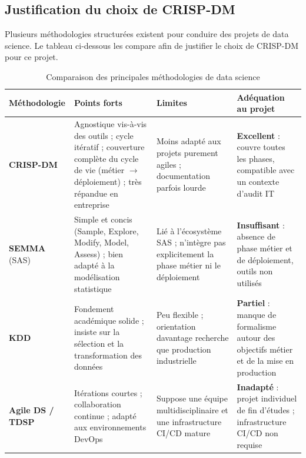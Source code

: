 \documentclass[12pt,a4paper,twoside]{report}
\begin{document}
\subsection{Justification du choix de CRISP-DM}

Plusieurs méthodologies structurées existent pour conduire des projets de data science. Le tableau ci-dessous les compare afin de justifier le choix de CRISP-DM pour ce projet.

\begin{table}[H]
\centering

\begin{tabular}{p{2.5cm}p{3.5cm}p{3.5cm}p{3.5cm}}
\toprule
\textbf{Méthodologie} & \textbf{Points forts} & \textbf{Limites} & \textbf{Adéquation au projet} \\
\midrule
\textbf{CRISP-DM} &
  Agnostique vis-à-vis des outils ; cycle itératif ; couverture complète du cycle de vie (métier $\rightarrow$ déploiement) ; très répandue en entreprise &
  Moins adapté aux projets purement agiles ; documentation parfois lourde &
  \textbf{Excellent} : couvre toutes les phases, compatible avec un contexte d'audit IT \\[0.4cm]
\textbf{SEMMA} (SAS) &
  Simple et concis (Sample, Explore, Modify, Model, Assess) ; bien adapté à la modélisation statistique &
  Lié à l'écosystème SAS ; n'intègre pas explicitement la phase métier ni le déploiement &
  \textbf{Insuffisant} : absence de phase métier et de déploiement, outils non utilisés \\[0.4cm]
\textbf{KDD} &
  Fondement académique solide ; insiste sur la sélection et la transformation des données &
  Peu flexible ; orientation davantage recherche que production industrielle &
  \textbf{Partiel} : manque de formalisme autour des objectifs métier et de la mise en production \\[0.4cm]
\textbf{Agile DS / TDSP} &
  Itérations courtes ; collaboration continue ; adapté aux environnements DevOps &
  Suppose une équipe multidisciplinaire et une infrastructure CI/CD mature &
  \textbf{Inadapté} : projet individuel de fin d'études ; infrastructure CI/CD non requise \\
\bottomrule
\end{tabular}
\caption{Comparaison des principales méthodologies de data science}
\label{tab:methodo_compare}
\end{table}
\end{document}
